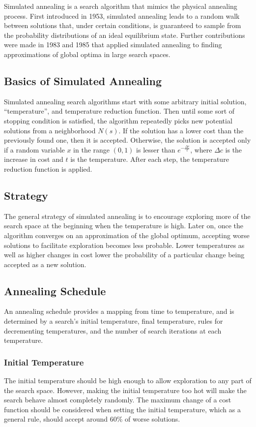 \documentclass[12pt,titlepage]{article}
\begin{document}
      Simulated annealing is a search algorithm that mimics the physical annealing process. First introduced in 1953, simulated annealing leads to a random walk between
      solutions that, under certain conditions, is guaranteed to sample from the probability distributions of an ideal equilibrium state. Further contributions were made in 1983
      and 1985 that applied simulated annealing to finding approximations of global optima in large search spaces.

    \subsection{Basics of Simulated Annealing}
      Simulated annealing search algorithms start with some arbitrary initial solution, ``temperature'', and temperature reduction function. Then until some sort of stopping condition
      is satisfied, the algorithm repeatedly picks new potential solutions from a neighborhood $N(s)$. If the solution has a lower cost than the previously found one, then it is accepted.
      Otherwise, the solution is accepted only if a random variable $x$ in the range $(0, 1)$ is lesser than $e^{- \frac{\Delta c}{t}}$, where $\Delta c$ is the increase in cost and $t$ is
      the temperature. After each step, the temperature reduction function is applied.

    \subsection{Strategy}
      The general strategy of simulated annealing is to encourage exploring more of the search space at the beginning when the temperature is high. Later on, once the algorithm converges
      on an approximation of the global optimum, accepting worse solutions to facilitate exploration becomes less probable. Lower temperatures as well as higher changes in cost lower the
      probability of a particular change being accepted as a new solution.

    \subsection{Annealing Schedule}
      An annealing schedule provides a mapping from time to temperature, and is determined by a search's initial temperature, final temperature, rules for decrementing temperatures, and the
      number of search iterations at each temperature.

      \subsubsection{Initial Temperature}
        The initial temperature should be high enough to allow exploration to any part of the search space. However, making the initial temperature too hot will make the search behave almost
        completely randomly. The maximum change of a cost function should be considered when setting the initial temperature, which as a general rule, should accept around 60\% of worse
        solutions.
\end{document}
